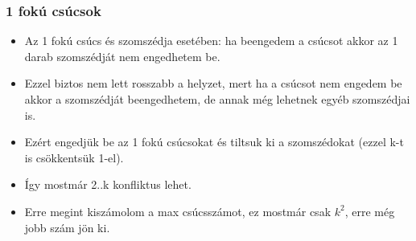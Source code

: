 \begin{frame}
\frametitle{1 fokú csúcsok}
\begin{itemize}
\item Az 1 fokú csúcs és szomszédja esetében: ha beengedem a csúcsot akkor az 1 darab szomszédját nem engedhetem be.
\item Ezzel biztos nem lett rosszabb a helyzet, mert ha a csúcsot nem engedem be akkor a szomszédját beengedhetem, de annak még lehetnek egyéb szomszédjai is.
\item Ezért engedjük be az 1 fokú csúcsokat és tiltsuk ki a szomszédokat (ezzel k-t is csökkentsük 1-el).
\item Így mostmár 2..k konfliktus lehet.
\item Erre megint kiszámolom a max csúcsszámot, ez mostmár csak $k^2$, erre még jobb szám jön ki.
\end{itemize}
\end{frame}
